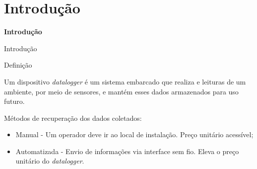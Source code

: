 \section{Introdução}


\begin{frame}
    
    \centering
    \color{blue_theme}\huge{\textbf{Introdução}}

\end{frame}



\begin{frame}{Introdução}
    \begin{block}{Definição}
        
        Um dispositivo \textit{datalogger} é um sistema embarcado que realiza e 
        leituras de um ambiente, por meio de sensores, e mantém esses dados
        armazenados para uso futuro.
    \end{block}






\end{frame}

\begin{frame}  

    Métodos de recuperação dos dados coletados: 
    
    \begin{itemize}
        \item Manual - Um operador deve ir ao local de instalação. Preço unitário acessível;  
        \item Automatizada - Envio de informações via interface sem fio. Eleva o preço unitário do \textit{datalogger}.
    \end{itemize}

\end{frame}    
    

